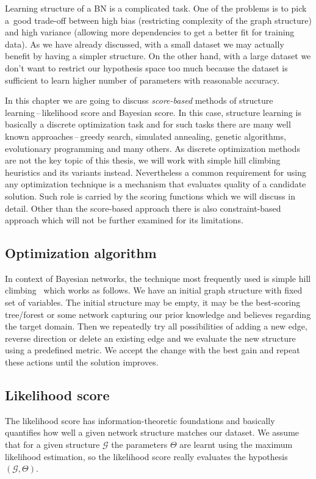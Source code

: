 \documentclass[english,cover]{fitthesis} %
\newcommand{\term}[1]{\emph{#1}}           %
\begin{document}
Learning structure of a BN is a complicated task. One of the problems is to pick a~good trade-off between high bias (restricting complexity of the graph structure) and high variance (allowing more dependencies to get a better fit for training data). As we have already discussed, with a small dataset we may actually benefit by having a simpler structure. On the other hand, with a large dataset we don't want to restrict our hypothesis space too much because the dataset is sufficient to learn higher number of parameters with reasonable accuracy.

In this chapter we are going to discuss \term{score-based} methods of structure learning\,--\,likelihood score and Bayesian score. In this case, structure learning is basically a discrete optimization task and for such tasks there are many well known approaches\,--\,greedy search, simulated annealing, genetic algorithms, evolutionary programming and many others. As discrete optimization methods are not the key topic of this thesis, we will work with simple hill climbing heuristics and its variants instead. Nevertheless a common requirement for using any optimization technique is a mechanism that evaluates quality of a candidate solution. Such role is carried by the scoring functions which we will discuss in detail.
Other than the score-based approach there is also constraint-based approach which will not be further examined for its limitations. %


\subsection{Optimization algorithm}
In context of Bayesian networks, the technique most frequently used is simple hill climbing~\cite{pgm} which works as follows. We have an initial graph structure with fixed set of variables. The initial structure may be empty, it may be the best-scoring tree/forest or some network capturing our prior knowledge and believes regarding the target domain. Then we repeatedly try all possibilities of adding a new edge, reverse direction or delete an existing edge and we evaluate the new structure using a predefined metric. We accept the change with the best gain and repeat these actions until the solution improves. %



\subsection{Likelihood score}
The likelihood score has information-theoretic foundations and basically quantifies how well a given network structure matches our dataset. We assume that for a given structure $\mathcal{G}$ the parameters $\Theta$ are learnt using the maximum likelihood estimation, so the likelihood score really evaluates the hypothesis $(\mathcal{G}, \Theta)$.
\end{document}
